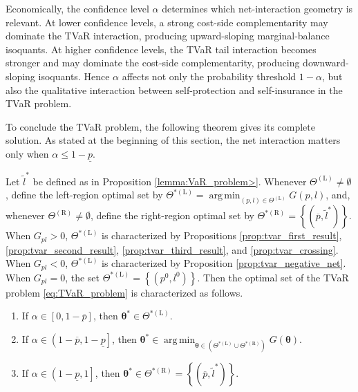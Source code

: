 \documentclass[a4paper,12pt]{article}
\DeclareMathOperator*{\argmin}{arg\,min}
\begin{document}
Economically, the confidence level $\alpha$ determines which net-interaction geometry is relevant. At lower confidence levels, a strong cost-side complementarity may dominate the TVaR interaction, producing upward-sloping marginal-balance isoquants. At higher confidence levels, the TVaR tail interaction becomes stronger and may dominate the cost-side complementarity, producing downward-sloping isoquants. Hence $\alpha$ affects not only the probability threshold $1-\alpha$, but also the qualitative interaction between self-protection and self-insurance in the TVaR problem.

To conclude the TVaR problem, the following theorem gives its complete solution. As stated at the beginning of this section, the net interaction matters only when $\alpha\leq 1-\underline{p}$.
\begin{theorem}\label{thm:tvar}
Let $\tilde{l}^*$ be defined as in Proposition \ref{lemma:VaR_problem>}. Whenever $\Theta^{\left(\text{L}\right)}\neq\emptyset$, define the left-region optimal set by $\Theta^{*\left(\text{L}\right)}=\argmin_{\left(p,l\right)\in\Theta^{\left(\text{L}\right)}}G\left(p,l\right)$, and, whenever $\Theta^{\left(\text{R}\right)}\neq\emptyset$, define the right-region optimal set by $\Theta^{*\left(\text{R}\right)}=\left\{\left(\overline{p},\tilde{l}^*\right)\right\}$. When $G_{pl}>0$, $\Theta^{*\left(\text{L}\right)}$ is characterized by Propositions \ref{prop:tvar_first_result}, \ref{prop:tvar_second_result}, \ref{prop:tvar_third_result}, and \ref{prop:tvar_crossing}. When $G_{pl}<0$, $\Theta^{*\left(\text{L}\right)}$ is characterized by Proposition \ref{prop:tvar_negative_net}. When $G_{pl}=0$, the set $\Theta^{*\left(\text{L}\right)}=\left\{\left(p^0,l^0\right)\right\}$. Then the optimal set of the TVaR problem \eqref{eq:TVaR_problem} is characterized as follows.
\begin{enumerate}
\item[(i)] If $\alpha\in\left[0,1-\overline{p}\right]$, then ${\bm\theta}^*\in\Theta^{*\left(\text{L}\right)}$.
\item[(ii)] If $\alpha\in\left(1-\overline{p},1-\underline{p}\right]$, then ${\bm\theta}^*\in\argmin_{{\bm\theta}\in\left(\Theta^{*\left(\text{L}\right)}\cup\Theta^{*\left(\text{R}\right)}\right)}G\left({\bm\theta}\right)$.
\item[(iii)] If $\alpha\in\left(1-\underline{p},1\right]$, then ${\bm\theta}^*\in\Theta^{*\left(\text{R}\right)}=\left\{\left(\overline{p},\tilde{l}^*\right)\right\}$.
\end{enumerate}
\end{theorem}
\end{document}
